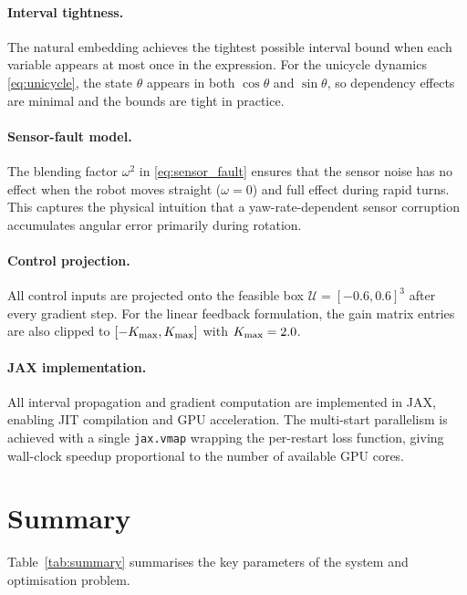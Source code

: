 \documentclass[11pt]{article}
\begin{document}
\paragraph{Interval tightness.}
The natural embedding achieves the tightest possible interval bound when each
variable appears at most once in the expression. For the unicycle dynamics
\eqref{eq:unicycle}, the state $\theta$ appears in both $\cos\theta$ and
$\sin\theta$, so dependency effects are minimal and the bounds are tight in
practice.

\paragraph{Sensor-fault model.}
The blending factor $\omega^2$ in \eqref{eq:sensor_fault} ensures that the
sensor noise has no effect when the robot moves straight ($\omega = 0$) and
full effect during rapid turns. This captures the physical intuition that a
yaw-rate-dependent sensor corruption accumulates angular error primarily during
rotation.

\paragraph{Control projection.}
All control inputs are projected onto the feasible box $\mathcal{U} =
[-0.6,0.6]^3$ after every gradient step. For the linear feedback formulation,
the gain matrix entries are also clipped to $[-K_{\rm max}, K_{\rm max}]$ with
$K_{\rm max} = 2.0$.

\paragraph{JAX implementation.}
All interval propagation and gradient computation are implemented in JAX,
enabling JIT compilation and GPU acceleration. The multi-start parallelism
is achieved with a single \texttt{jax.vmap} wrapping the per-restart loss
function, giving wall-clock speedup proportional to the number of available
GPU cores.

\section{Summary}

Table~\ref{tab:summary} summarises the key parameters of the system and
optimisation problem.
\end{document}
